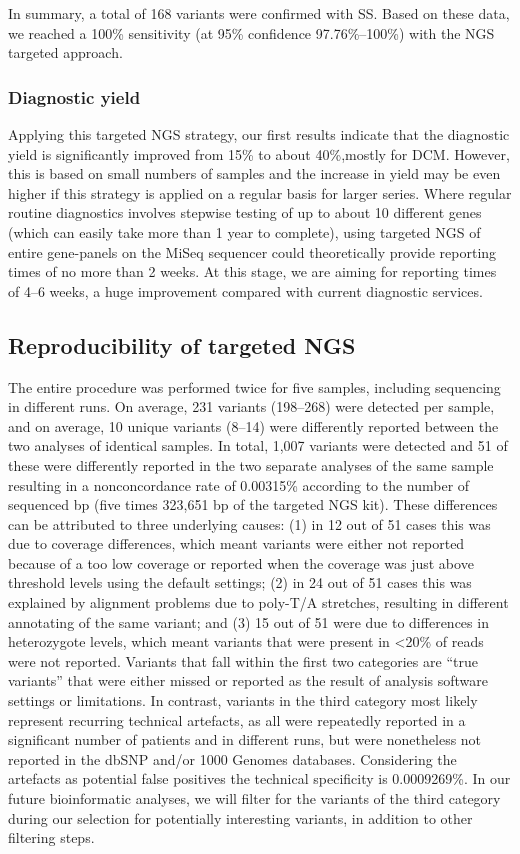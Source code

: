 In summary, a total of 168 variants were confirmed with SS. 
Based on these data, we reached a 100\% sensitivity (at 95\% confidence 97.76\%–100\%) \cite{Waerden_1957} with the NGS targeted approach.

\subsubsection{Diagnostic yield}
Applying this targeted NGS strategy, our first results indicate that the diagnostic yield is significantly improved from 15\% to about 40\%,mostly for DCM. 
However, this is based on small numbers of samples and the increase in yield may be even higher if this strategy is applied on a regular basis for larger series. 
Where regular routine diagnostics involves stepwise testing of up to about 10 different genes (which can easily take more than 1 year to complete), using targeted NGS of entire gene-panels on the MiSeq sequencer could theoretically provide reporting times of no more than 2 weeks. 
At this stage, we are aiming for reporting times of 4–6 weeks, a huge improvement compared with current diagnostic services.

\subsection{Reproducibility of targeted NGS}
The entire procedure was performed twice for five samples, including sequencing in different runs. 
On average, 231 variants (198–268) were detected per sample, and on average, 10 unique variants (8–14) were differently reported between the two analyses of identical samples. 
In total, 1,007 variants were detected and 51 of these were differently reported in the two separate analyses of the same sample resulting in a nonconcordance rate of 0.00315\% according to the number of sequenced bp (five times 323,651 bp of the targeted NGS kit). 
These differences can be attributed to three underlying causes: (1) in 12 out of 51 cases this was due to coverage differences, which meant variants were either not reported because of a too low coverage or reported when the coverage was just above threshold levels using the default settings; (2) in 24 out of 51 cases this was explained by alignment problems due to poly-T/A stretches, resulting in different annotating of the same variant; and (3) 15 out of 51 were due to differences in heterozygote levels, which meant variants that were present in {\textless}20\% of reads were not reported. 
Variants that fall within the first two categories are “true variants” that were either missed or reported as the result of analysis software settings or limitations. 
In contrast, variants in the third category most likely represent recurring technical artefacts, as all were repeatedly reported in a significant number of patients and in different runs, but were nonetheless not reported in the dbSNP and/or 1000 Genomes databases. 
Considering the artefacts as potential false positives the technical specificity is 0.0009269\%. 
In our future bioinformatic analyses, we will filter for the variants of the third category during our selection for potentially interesting variants, in addition to other filtering steps.

